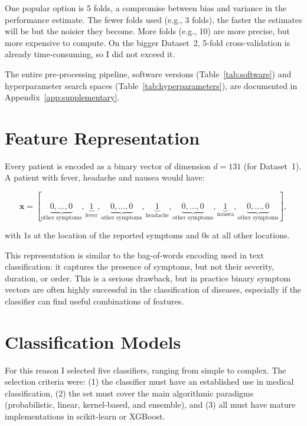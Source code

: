 One popular option is 5 folds, a compromise between bias and variance in the performance estimate. The fewer folds used (e.g., 3 folds), the faster the estimates will be but the noisier they become. More folds (e.g., 10) are more precise, but more expensive to compute. On the bigger Dataset~2, 5-fold cross-validation is already time-consuming, so I did not exceed it.

The entire pre-processing pipeline, software versions (Table~\ref{tab:software}) and hyperparameter search spaces (Table~\ref{tab:hyperparameters}), are documented in Appendix~\ref{app:supplementary}.

\section{Feature Representation}
\label{sec:feature_representation}

Every patient is encoded as a binary vector of dimension $d = 131$ (for Dataset~1). A patient with fever, headache and nausea would have:

\begin{equation}
\label{eq:feature_vector}
\mathbf{x} = [\underbrace{0, \ldots, 0}_{\text{other symptoms}}, \underbrace{1}_{\text{fever}}, \underbrace{0, \ldots, 0}_{\text{other symptoms}}, \underbrace{1}_{\text{headache}}, \underbrace{0, \ldots, 0}_{\text{other symptoms}}, \underbrace{1}_{\text{nausea}}, \underbrace{0, \ldots, 0}_{\text{other symptoms}}],
\end{equation}

\noindent with 1s at the location of the reported symptoms and 0s at all other locations.

This representation is similar to the bag-of-words encoding used in text classification: it captures the presence of symptoms, but not their severity, duration, or order. This is a serious drawback, but in practice binary symptom vectors are often highly successful in the classification of diseases, especially if the classifier can find useful combinations of features.

\section{Classification Models}
\label{sec:models}

For this reason I selected five classifiers, ranging from simple to complex. The selection criteria were: (1) the classifier must have an established use in medical classification, (2) the set must cover the main algorithmic paradigms (probabilistic, linear, kernel-based, and ensemble), and (3) all must have mature implementations in scikit-learn or XGBoost.


